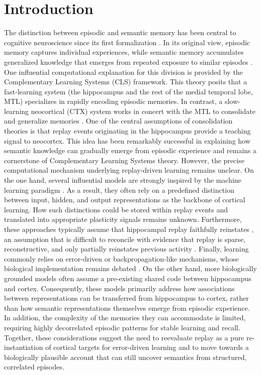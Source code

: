 \documentclass{article}
\providecommand{\DIFaddtex}[1]{{\protect\color{blue}\uwave{#1}}} %
\providecommand{\DIFaddbegin}{} %
\providecommand{\DIFaddend}{} %
\providecommand{\DIFadd}[1]{\texorpdfstring{\DIFaddtex{#1}}{#1}} %
\begin{document}
\section*{Introduction}
The distinction between episodic and semantic memory has been central to cognitive neuroscience since its first formalization . In its original view, episodic memory captures individual experiences, while semantic memory accumulates generalized knowledge that emerges from repeated exposure to similar episodes . One influential computational explanation for this division is provided by the Complementary Learning Systems (CLS) framework. This theory posits that a fast-learning system (the hippocampus and the rest of the medial temporal lobe, MTL) specializes in rapidly encoding episodic memories. In contrast, a slow-learning neocortical (CTX) system works in concert with the MTL to consolidate and generalize memories .
\newline\newline
One of the central assumptions of consolidation theories is that replay events originating in the hippocampus provide a teaching signal to neocortex. This idea has been remarkably successful in explaining how semantic knowledge can gradually emerge from episodic experience and remains a cornerstone of Complementary Learning Systems theory. However, the precise computational mechanism underlying replay-driven learning remains unclear. On the one hand, several influential models are strongly inspired by the machine learning paradigm . As a result, they often rely on a predefined distinction between input, hidden, and output representations as the backbone of cortical learning. How such distinctions could be stored within replay events and translated into appropriate plasticity signals remains unknown. Furthermore, these approaches typically assume that hippocampal replay faithfully reinstates  \DIFaddbegin \DIFadd{the entirety of episodic neural activity during encoding}\DIFaddend , an assumption that is difficult to reconcile with evidence that replay is sparse, reconstructive, and only partially reinstates previous activity . Finally, learning commonly relies on error-driven or backpropagation-like mechanisms, whose biological implementation remains debated . On the other hand, more biologically grounded models  often assume a pre-existing shared code between hippocampus and cortex. Consequently, these models primarily address how associations between representations can be transferred from hippocampus to cortex, rather than how semantic representations themselves emerge from episodic experience. In addition, the complexity of the memories they can accommodate is limited, requiring highly decorrelated episodic patterns for stable learning and recall. Together, these considerations suggest the need to reevaluate replay as a pure re-instantiation of cortical targets for error-driven learning and to move towards a biologically plausible account that can still uncover semantics from structured, correlated episodes.
\end{document}
